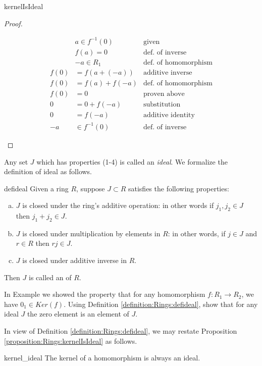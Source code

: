 \begin{prop}{kernelIsIdeal}
\begin{proof}
\begin{enumerate}
\begin{align*}
&a\in f^{-1}(0) & \text{given}\\
&f(a)=0 & \text{def. of inverse}\\
&-a\in R_1 & \text{def. of homomorphism}\\
f(0)&=f(a+(-a)) & \text{additive inverse}\\
f(0)&=f(a)+f(-a) & \text{def. of homomorphism}\\
f(0)&=0 & \text{proven above}\\
0&=0+f(-a) & \text{substitution}\\
0&=f(-a) & \text{additive identity}\\
-a&\in f^{-1}(0) & \text{def. of inverse}
\end{align*}
\end{enumerate}
\end{proof}
\end{prop}

Any set $J$ which has properties (1-4) is called an \textit{ideal}.  We formalize the definition of ideal as follows.

\begin{defn}{defideal}
Given a ring $R$, suppose $J \subset R$ satisfies the following properties:
\begin{enumerate}[(a)]
\item $J$ is closed under the ring's additive operation:  in other words if $j_1,j_2\in J$ then $j_1+j_2\in J$.
\item $J$ is closed under multiplication by elements in $R$:  in other words, if $j\in J$ and $r\in R$ then $rj\in J$.
\item $J$ is closed under additive inverse in $R$.
\end{enumerate}
Then $J$ is called an  of $R$.
\end{defn}

\begin{exercise}{}
In Example we showed the property that for any homomorphism $f:R_1\rightarrow R_2$, we have $0_1\in Ker(f)$.  Using Definition \ref{definition:Rings:defideal}, show that for any ideal $J$ the zero element is an element of $J$. 
\end{exercise}

In view of Definition \ref{definition:Rings:defideal}, we may restate Proposition \ref{proposition:Rings:kernelIsIdeal} as follows.

\begin{prop}{kernel_ideal}
The kernel of a homomorphism is always an ideal.
\end{prop}

